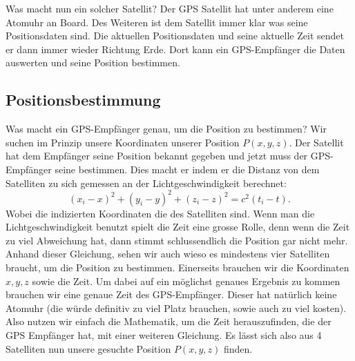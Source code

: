 \begin{refsection}
Was macht nun ein solcher Satellit? Der GPS Satellit hat unter anderem eine Atomuhr an Board. Des Weiteren ist dem Satellit immer klar was seine Positionsdaten sind. Die aktuellen Positionsdaten und seine aktuelle Zeit sendet er dann immer wieder Richtung Erde. Dort kann ein GPS-Empfänger die Daten auswerten und seine Position bestimmen.

\subsection{Positionsbestimmung}
Was macht ein GPS-Empfänger genau, um die Position zu bestimmen? Wir suchen im Prinzip unsere Koordinaten unserer Position $P(x,y,z)$. Der Satellit hat dem Empfänger seine Position bekannt gegeben und jetzt muss der GPS-Empfänger seine bestimmen. Dies macht er indem er die Distanz von dem Satelliten zu sich gemessen an der Lichtgeschwindigkeit berechnet:
\begin{equation}
\label{eq:positioning}
    (x_i-x)^2 + (y_i-y)^2 + (z_i-z)^2 = c^2 (t_i -t).
\end{equation}
Wobei die indizierten Koordinaten die des Satelliten sind. Wenn man die Lichtgeschwindigkeit benutzt spielt die Zeit eine grosse Rolle, denn wenn die Zeit zu viel Abweichung hat, dann stimmt schlussendlich die Position gar nicht mehr. Anhand dieser Gleichung, sehen wir auch wieso es mindestens vier Satelliten braucht, um die Position zu bestimmen. Einerseits brauchen wir die Koordinaten $x,y,z$ sowie die Zeit. Um dabei auf ein möglichst genaues Ergebnis zu kommen brauchen wir eine genaue Zeit des GPS-Empfänger. Dieser hat natürlich keine Atomuhr (die würde definitiv zu viel Platz brauchen, sowie auch zu viel kosten). Also nutzen wir einfach die Mathematik, um die Zeit herauszufinden, die der GPS Empfänger hat, mit einer weiteren Gleichung. Es lässt sich also aus 4 Satelliten nun unsere gesuchte Position $P(x,y,z)$ finden. 


\end{refsection}
